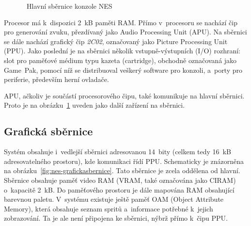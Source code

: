 \begin{figure}[ht!]
	\centering
	\caption{~Hlavní sběrnice konzole NES}\label{fig:nes-hlavnisbernice}
\end{figure}

Procesor má k~dispozici 2~kB paměti RAM. Přímo v~procesoru se nachází čip pro generování zvuku, přezdívaný jako Audio Processing Unit (APU).  Na sběrnici se dále nachází grafický čip \emph{2C02}, označovaný jako Picture Processing Unit (PPU). Jako poslední je na sběrnici několik vstupně-výstupních (I/O) rozhraní: slot pro paměťové médium typu kazeta (cartridge), obchodně označovaná jako Game~Pak, pomocí níž se distribuoval veškerý software pro konzoli, a~porty pro periferie, především herní ovladače.

\begin{note}
	APU, ačkoliv je součástí procesorového čipu, také komunikuje na hlavní sběrnici. Proto je na obrázku~\ref{fig:nes-hlavnisbernice} uveden jako další zařízení na sběrnici.
\end{note}

\subsection{Grafická sběrnice}
Systém obsahuje i~vedlejší sběrnici adresovanou 14~bity (celkem tedy 16~kB adresovatelného prostoru), kde komunikaci řídí PPU. Schematicky je znázorněna na obrázku~\ref{fig:nes-grafickasbernice}. Tato sběrnice je zcela oddělena od hlavní. Sběrnice obsahuje paměť video RAM (VRAM, také označována jako CIRAM) o~kapacitě 2~kB. Do paměťového prostoru je dále mapována RAM obsahující barevnou paletu. V~systému existuje ještě paměť OAM (Object Attribute Memory), která obsahuje seznam spritů a~informace potřebné k~jejich zobrazování. Ta je ale není připojena ke sběrnici, nýbrž přímo k~čipu PPU.

